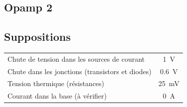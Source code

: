 \documentclass[resume]{subfiles}
\begin{document}
\begin{multicols}{3}
\section{Opamp 2}
\subsection{Suppositions}
\begin{tabular}{p{6cm}c}
Chute de tension dans les sources de courant & \SI{1}{\volt}\\
Chute dans les jonctions (transistors et diodes) & \SI{0.6}{\volt}\\
Tension thermique (résistances) & \SI{25}{\milli\volt}\\
Courant dans la base (à vérifier) & \SI{0}{\ampere}
\end{tabular}

\end{multicols}
\end{document}
